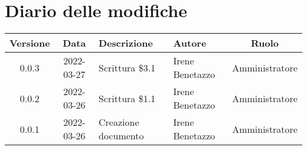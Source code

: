 \section*{Diario delle modifiche}
	\begin{center}
	\renewcommand{\arraystretch}{1.8} %
	\begin{tabular}{ |c|c|m{12em}|m{7em}|c| }
	\hline
	\textbf{Versione} & \textbf{Data} & \textbf{Descrizione} &  \textbf{Autore} &  \textbf{Ruolo} \\ %
	\hline
	0.0.3 & 2022-03-27 & Scrittura \$3.1 & Irene Benetazzo & Amministratore\\ %
	\hline
	0.0.2 & 2022-03-26 & Scrittura \$1.1 & Irene Benetazzo & Amministratore\\
	\hline
    0.0.1 & 2022-03-26 & Creazione documento & Irene Benetazzo & Amministratore\\
	\hline
	\end{tabular}
	\end{center}
	\newpage
	
	\tableofcontents
	\newpage